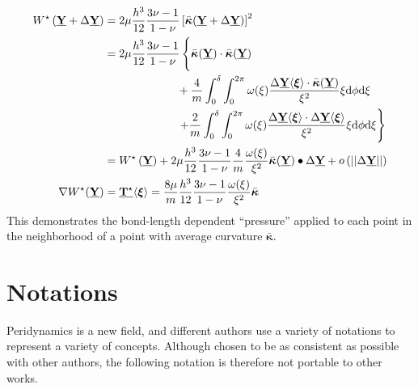 \begin{align}
    W^\star\left(\vstate{Y}{}{}+\Delta\vstate{Y}{}{}\right) &=2\mu\frac{h^3}{12}\frac{3\nu-1}{1-\nu}\left[\bar{\boldsymbol{\kappa}}\!\left(\vstate{Y}{}{}+\Delta\vstate{Y}{}{}\right)\right]^2 \notag \\
    &=2\mu\frac{h^3}{12}\frac{3\nu-1}{1-\nu} \left\{ \vphantom{\int_0^\delta} \bar{\boldsymbol{\kappa}}\!\left(\vstate{Y}{}{}\right) \cdot \bar{\boldsymbol{\kappa}}\!\left(\vstate{Y}{}{}\right)\right. \notag \\
    &\phantom{=2\mu\frac{h^3}{12}\frac{3\nu-1}{1-\nu}} + \frac{4}{m} \int_0^\delta \int_0^{2\pi}\omega(\xi)\frac{\Delta\vstate{Y}{}{\boldsymbol{\xi}}\cdot \bar{\boldsymbol{\kappa}}\!\left(\vstate{Y}{}{}\right)}{\xi^2} \xi {\rm d}\phi {\rm d}\xi \notag \\
    &\phantom{=2\mu\frac{h^3}{12}\frac{3\nu-1}{1-\nu}}\left. + \frac{2}{m} \int_0^\delta \int_0^{2\pi}\omega(\xi)\frac{\Delta\vstate{Y}{}{\boldsymbol{\xi}}\cdot \Delta\vstate{Y}{}{\boldsymbol{\xi}}}{\xi^2} \xi {\rm d}\phi {\rm d}\xi\right\} \notag \\
    &=W^\star\left(\vstate{Y}{}{}\right)+ 2\mu\frac{h^3}{12}\frac{3\nu-1}{1-\nu} \frac{4}{m} \frac{\omega(\xi)}{\xi^2} \bar{\boldsymbol{\kappa}}\!\left(\vstate{Y}{}{}\right) \bullet \Delta\vstate{Y}{}{} + o\left(||\Delta\vstate{Y}{}{}||\right)\notag \\
    \nabla W^\star\!\left(\vstate{Y}{}{}\right) &= \vstate{T^\star}{}{\boldsymbol{\xi}} =  \frac{8 \mu}{m} \frac{h^3}{12}\frac{3\nu-1}{1-\nu}\frac{\omega(\xi)}{\xi^2} \bar{\boldsymbol{\kappa}}\notag
\end{align}
%
This demonstrates the bond-length dependent ``pressure'' applied to each point in the neighborhood of a point with average curvature $\bar{\boldsymbol{\kappa}}$.




\chapter{Notations }

Peridynamics is a new field, and different authors use a variety of notations to represent a variety of concepts.
Although chosen to be as consistent as possible with other authors, the following notation is therefore not portable to other works.

